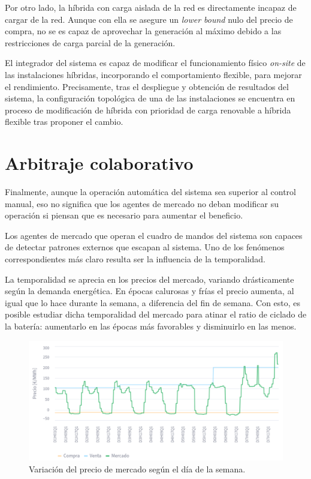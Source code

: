 Por otro lado, la híbrida con carga aislada de la red es directamente incapaz de cargar de la red. Aunque con ella se asegure un \textit{lower bound} nulo del precio de compra, no se es capaz de aprovechar la generación al máximo debido a las restricciones de carga parcial de la generación.

El integrador del sistema es capaz de modificar el funcionamiento físico \textit{on-site} de las instalaciones híbridas, incorporando el comportamiento flexible, para mejorar el rendimiento. Precisamente, tras el despliegue y obtención de resultados del sistema, la configuración topológica de una de las instalaciones se encuentra en proceso de modificación de híbrida con prioridad de carga renovable a híbrida flexible tras proponer el cambio.

\section{Arbitraje colaborativo}
\label{makereference7.5}

Finalmente, aunque la operación automática del sistema sea superior al control manual, eso no significa que los agentes de mercado no deban modificar su operación si piensan que es necesario para aumentar el beneficio.

Los agentes de mercado que operan el cuadro de mandos del sistema son capaces de detectar patrones externos que escapan al sistema. Uno de los fenómenos correspondientes más claro resulta ser la influencia de la temporalidad.

La temporalidad se aprecia en los precios del mercado, variando drásticamente según la demanda energética. En épocas calurosas y frías el precio aumenta, al igual que lo hace durante la semana, a diferencia del fin de semana. Con esto, es posible estudiar dicha temporalidad del mercado para atinar el ratio de ciclado de la batería: aumentarlo en las épocas más favorables y disminuirlo en las menos.

\begin{figure}
  \centering
  \includegraphics[width=0.5\linewidth]{figures/temporalidad-mercado.png}
  \caption{Variación del precio de mercado según el día de la semana.}
  \label{fig:temporalidad-mercado}
\end{figure}

